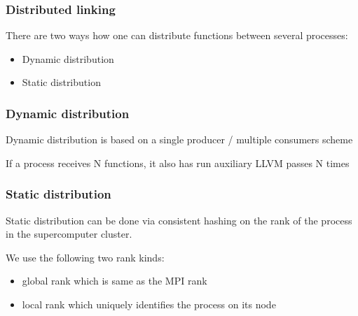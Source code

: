 
\begin{frame}
\frametitle{Distributed linking}
There are two ways how one can distribute functions between several processes:
	\begin{itemize}
		\item Dynamic distribution
		\item Static distribution
	\end{itemize}
\end{frame}


\begin{frame}
\frametitle{Dynamic distribution}
\begin{block}
	\centering
	Dynamic distribution is based on a single producer / multiple consumers scheme
\end{block}

\begin{block}
	\centering
	If a process receives N functions, it also has run auxiliary LLVM passes N times
\end{block}
\end{frame}


\begin{frame}
\frametitle{Static distribution}
\begin{block}
	\centering
	Static distribution can be done via consistent hashing on the rank of the process in the supercomputer cluster.
\end{block}
We use the following two rank kinds:
	\begin{itemize}
		\item global rank which is same as the MPI rank
		\item local rank which uniquely identifies the process on its node
	\end{itemize}
\end{frame}

